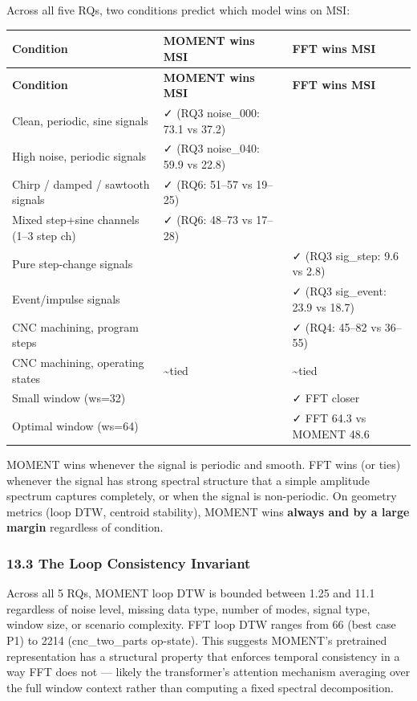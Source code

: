 \documentclass[11pt,a4paper]{article}
\begin{document}
Across all five RQs, two conditions predict which model wins on MSI:

\begin{longtable}{|l|l|l|}
\hline
\textbf{Condition} & \textbf{MOMENT wins MSI} & \textbf{FFT wins MSI} \\
\hline
\endfirsthead
\hline
\textbf{Condition} & \textbf{MOMENT wins MSI} & \textbf{FFT wins MSI} \\
\hline
\endhead
\hline
\endfoot
Clean, periodic, sine signals & ✓ (RQ3 noise\_000: 73.1 vs 37.2) &  \\
\hline
High noise, periodic signals & ✓ (RQ3 noise\_040: 59.9 vs 22.8) &  \\
\hline
Chirp / damped / sawtooth signals & ✓ (RQ6: 51--57 vs 19--25) &  \\
\hline
Mixed step+sine channels (1--3 step ch) & ✓ (RQ6: 48--73 vs 17--28) &  \\
\hline
Pure step-change signals &  & ✓ (RQ3 sig\_step: 9.6 vs 2.8) \\
\hline
Event/impulse signals &  & ✓ (RQ3 sig\_event: 23.9 vs 18.7) \\
\hline
CNC machining, program steps &  & ✓ (RQ4: 45--82 vs 36--55) \\
\hline
CNC machining, operating states & \textasciitilde{}tied & \textasciitilde{}tied \\
\hline
Small window (ws=32) &  & ✓ FFT closer \\
\hline
Optimal window (ws=64) &  & ✓ FFT 64.3 vs MOMENT 48.6 \\
\hline
\end{longtable}

MOMENT wins whenever the signal is periodic and smooth. FFT wins (or ties) whenever the signal
has strong spectral structure that a simple amplitude spectrum captures completely, or when the
signal is non-periodic. On geometry metrics (loop DTW, centroid stability), MOMENT wins
\textbf{always and by a large margin} regardless of condition.

\subsubsection{13.3 The Loop Consistency Invariant}

Across all 5 RQs, MOMENT loop DTW is bounded between 1.25 and 11.1 regardless of noise level,
missing data type, number of modes, signal type, window size, or scenario complexity. FFT loop
DTW ranges from 66 (best case P1) to 2214 (cnc\_two\_parts op-state). This suggests MOMENT's
pretrained representation has a structural property that enforces temporal consistency in a
way FFT does not --- likely the transformer's attention mechanism averaging over the full window
context rather than computing a fixed spectral decomposition.
\end{document}
